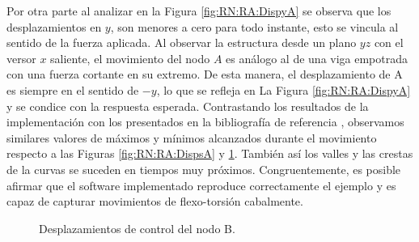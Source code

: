 Por otra parte al analizar en la Figura \ref{fig:RN:RA:DispyA} se observa que los desplazamientos en $y$, son menores a cero para todo instante, esto se vincula al sentido de la fuerza aplicada. Al observar la estructura desde un plano $yz$ con el versor $x$ saliente, el movimiento del nodo $A$ es análogo al de una viga empotrada con una fuerza cortante en su extremo. De esta manera, el desplazamiento de A es siempre en el sentido de $-y$, lo que se refleja en La Figura \ref{fig:RN:RA:DispyA} y se condice con la respuesta esperada. Contrastando los resultados de la implementación con los presentados en la bibliografía de referencia \textcite{Le2014}, observamos similares valores de máximos y mínimos alcanzados durante el movimiento respecto a las Figuras \ref{fig:RN:RA:DispsA} y \ref{fig:RN:RA:DispsB}. También así los valles y las crestas de la curvas se suceden en tiempos muy próximos. Congruentemente, es posible afirmar que el software implementado reproduce correctamente el ejemplo y es capaz de capturar movimientos de flexo-torsión cabalmente. 


\begingroup
\centering
\begin{figure}[htbp]
	\centering
	\caption{Desplazamientos de control del nodo B.} \label{fig:RN:RA:DispsB}
\end{figure}
\endgroup

